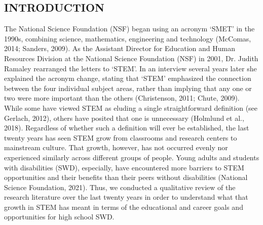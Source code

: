 \documentclass[11.5pt]{sig-alternate}
\begin{document}
\clearpage
\begin{large}
\section*{INTRODUCTION}
The National Science Foundation (NSF) began using an acronym ‘SMET’ in the 1990s, combining science, mathematics, engineering and technology (McComas, 2014; Sanders, 2009). As the Assistant Director for Education and Human Resources Division at the National Science Foundation (NSF) in 2001, Dr. Judith Ramaley rearranged the letters to ‘STEM’. In an interview several years later she explained the acronym change, stating that ‘STEM’ emphasized the connection between the four individual subject areas, rather than implying that any one or two were more important than the others (Christenson, 2011; Chute, 2009). 
While some have viewed STEM as eluding a single straightforward definition (see Gerlach, 2012), others have posited that one is unnecessary (Holmlund et al., 2018). Regardless of whether such a definition will ever be established, the last twenty years has seen STEM grow from classrooms and research centers to mainstream culture. That growth, however, has not occurred evenly nor experienced similarly across different groups of people. Young adults and students with disabilities (SWD), especially, have encountered more barriers to STEM opportunities and their benefits than their peers without disabilities (National Science Foundation, 2021). Thus, we conducted a qualitative review of the research literature over the last twenty years in order to understand what that growth in STEM has meant in terms of the educational and career goals and opportunities for high school SWD. 


\end{large}
\end{document}
